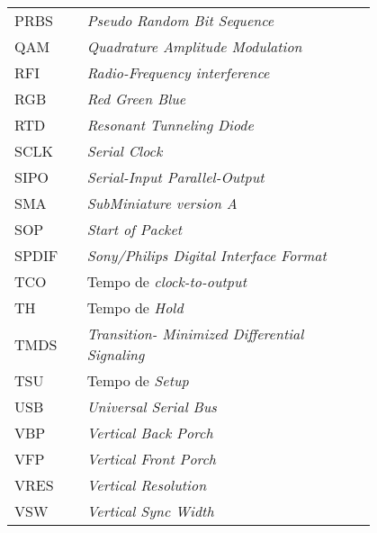 \begin{flushleft}
\begin{longtable}{l p{0.8\linewidth}}
PRBS      & \textit{Pseudo Random Bit Sequence}                                                                   \\
QAM       & \textit{Quadrature Amplitude Modulation}                                                              \\
RFI       & \textit{Radio-Frequency interference }                                                                \\
RGB       & \textit{Red Green Blue }                                                                              \\
RTD       & \textit{Resonant Tunneling Diode }                                                                    \\
SCLK      & \textit{Serial Clock }                                                                                \\
SIPO      & \textit{Serial-Input Parallel-Output    }                                                             \\
SMA       &\textit{ SubMiniature version A }                                                                      \\
SOP       & \textit{Start of Packet}                                                                              \\
SPDIF     & \textit{Sony/Philips Digital Interface Format }                                                       \\
TCO       & Tempo de \textit{clock-to-output }                                                                    \\
TH        & Tempo de \textit{Hold }                                                                               \\
TMDS      & \textit{Transition- Minimized Differential Signaling}                                                 \\
TSU       & Tempo de \textit{Setup}                                                                               \\
USB       & \textit{Universal Serial Bus}                                                                         \\
VBP       & \textit{Vertical Back Porch}                                                                          \\
VFP       & \textit{Vertical Front Porch}                                                                         \\
VRES      & \textit{Vertical Resolution }                                                                         \\
VSW       & \textit{Vertical Sync Width}                                                                         
\end{longtable}
\end{flushleft}

